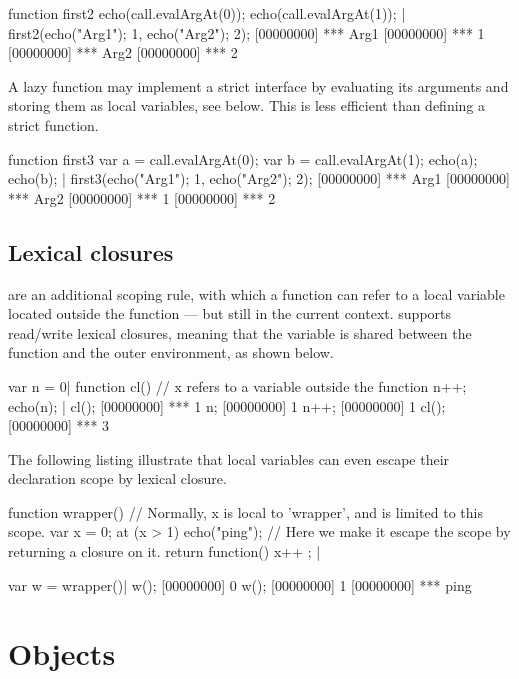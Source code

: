 \begin{urbiscript}
function first2
{
  echo(call.evalArgAt(0));
  echo(call.evalArgAt(1));
}|
first2({echo("Arg1"); 1},
       {echo("Arg2"); 2});
[00000000] *** Arg1
[00000000] *** 1
[00000000] *** Arg2
[00000000] *** 2
\end{urbiscript}

A lazy function may implement a strict interface by evaluating its
arguments and storing them as local variables, see below.  This is
less efficient than defining a strict function.

\begin{urbiscript}
function first3
{
  var a = call.evalArgAt(0);
  var b = call.evalArgAt(1);
  echo(a); echo(b);
}|
first3({echo("Arg1"); 1},
       {echo("Arg2"); 2});
[00000000] *** Arg1
[00000000] *** Arg2
[00000000] *** 1
[00000000] *** 2
\end{urbiscript}

\subsection{Lexical closures}
\label{sec:us-fun-closures}

 are an additional scoping rule, with which a function
can refer to a local variable located outside the function --- but still
in the current context. \us supports read/write lexical closures,
meaning that the variable is shared between the function and the outer
environment, as shown below.

\begin{urbiscript}
var n = 0|
function cl()
{
  // x refers to a variable outside the function
  n++;
  echo(n);
}|
cl();
[00000000] *** 1
n;
[00000000] 1
n++;
[00000000] 1
cl();
[00000000] *** 3
\end{urbiscript}

The following listing illustrate that local variables can even
escape their declaration scope by lexical closure.

\begin{urbiscript}
function wrapper()
{
  // Normally, x is local to 'wrapper', and is limited to this scope.
  var x = 0;
  at (x > 1)
    echo("ping");
  // Here we make it escape the scope by returning a closure on it.
  return function() { x++ };
} |

var w = wrapper()|
w();
[00000000] 0
w();
[00000000] 1
[00000000] *** ping
\end{urbiscript}


\section{Objects}

